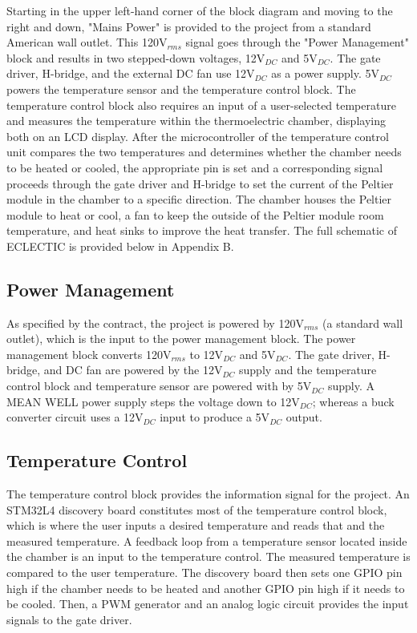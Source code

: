 \documentclass[11pt,letter]{article}
\begin{document}
Starting in the upper left-hand corner of the block diagram and moving to the right and down, "Mains Power" is provided to the project from a standard American wall outlet. This 120V$_{rms}$ signal goes through the "Power Management" block and results in two stepped-down voltages, 12V$_{DC}$ and 5V$_{DC}$. The gate driver, H-bridge, and the external DC fan use 12V$_{DC}$ as a power supply. 5V$_{DC}$ powers the temperature sensor and the temperature control block. The temperature control block also requires an input of a user-selected temperature and measures the temperature within the thermoelectric chamber, displaying both on an LCD display. After the microcontroller of the temperature control unit compares the two temperatures and determines whether the chamber needs to be heated or cooled, the appropriate pin is set and a corresponding signal proceeds through the gate driver and H-bridge to set the current of the Peltier module in the chamber to a specific direction. The chamber houses the Peltier module to heat or cool, a fan to keep the outside of the Peltier module room temperature, and heat sinks to improve the heat transfer. The full schematic of ECLECTIC is provided below in Appendix B.

\subsection{Power Management} %

As specified by the contract, the project is powered by 120V$_{rms}$ (a standard wall outlet), which is the input to the power management block. The power management block converts 120V$_{rms}$ to 12V$_{DC}$ and 5V$_{DC}$. The gate driver, H-bridge, and DC fan are powered by the 12V$_{DC}$ supply and the temperature control block and temperature sensor are powered with by 5V$_{DC}$ supply. A MEAN WELL power supply steps the voltage down to 12V$_{DC}$; whereas a buck converter circuit uses a 12V$_{DC}$ input to produce a 5V$_{DC}$ output.

\subsection{Temperature Control} %

The temperature control block provides the information signal for the project. An STM32L4 discovery board constitutes most of the temperature control block, which is where the user inputs a desired temperature and reads that and the measured temperature. A feedback loop from a temperature sensor located inside the chamber is an input to the temperature control. The measured temperature is compared to the user temperature. The discovery board then sets one GPIO pin high if the chamber needs to be heated and another GPIO pin high if it needs to be cooled. Then, a PWM generator and an analog logic circuit provides the input signals to the gate driver.
\end{document}
